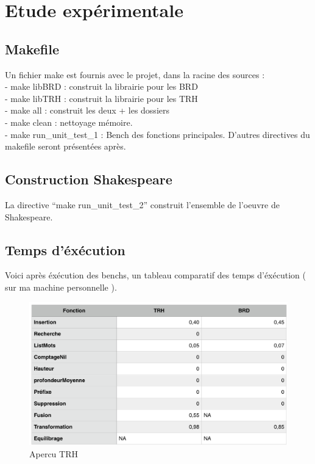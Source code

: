 \documentclass[a4paper,8pt]{report}
\begin{document}
\chapter{Etude expérimentale}

\section*{Makefile}\label{sec:name}
Un fichier make est fournis avec le projet, dans la racine des sources :\\
- make libBRD : construit la librairie pour les BRD\\
- make libTRH : construit la librairie pour les TRH\\
- make all : construit les deux + les dossiers\\
- make clean : nettoyage mémoire.\\
- make run\_unit\_test\_1 : Bench des fonctions principales.
D'autres directives du makefile seront présentées après.

\section*{Construction Shakespeare}\label{sec:name}
La directive ``make run\_unit\_test\_2'' construit l'ensemble de l'oeuvre de Shakespeare.

\section*{Temps d'éxécution}\label{sec:name}
Voici après éxécution des benchs, un tableau comparatif des temps d'éxécution ( sur ma machine personnelle ).
\begin{figure}[H]
  \centering
  \includegraphics[width=1.0\textwidth]{temps.png}
  \caption{Apercu TRH}
  \label{fig:Aprecu TRH}
\end{figure}
\end{document}
